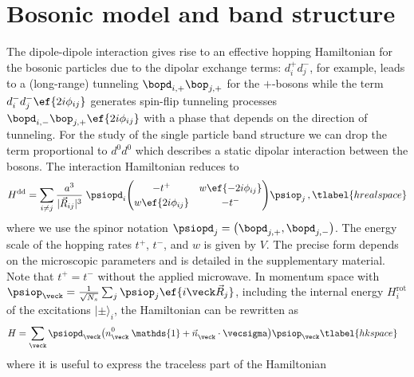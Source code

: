 \section{Bosonic model and band structure}

The dipole-dipole interaction gives rise to an effective hopping Hamiltonian for the bosonic particles due to the dipolar exchange terms:
$d^+_id^-_j$, for example, leads to a (long-range) tunneling $\bopd_{i,+}\bop_{j,+}$ for the ${+}$-bosons while the term $d^-_i d^-_j \ef{2i\phi_{i j}}$ generates spin-flip tunneling processes $\bopd_{i,-}\bop_{j,+} \ef{2i\phi_{ij}}$ with a phase that depends on the direction of tunneling.
For the study of the single particle band structure we can drop the term proportional to $d^0 d^0$ which describes a static dipolar interaction between the bosons.
The interaction Hamiltonian reduces to
\begin{align}
    H^{\text{dd}} = \sum_{i\ne j}
    \frac{a^3}{|\vec{R}_{ij}|^3}\;
    \psiopd_i\!
    \begingroup
        \renewcommand*{\arraystretch}{1.2}
        \begin{pmatrix}
            -t^+ & w \ef{-2i\phi_{ij}} \\
            w \ef{2i\phi_{ij}} & -t^-
        \end{pmatrix}
    \endgroup\!
    \psiop_j \,,
    \tlabel{hrealspace}
\end{align}
where we use the spinor notation $\psiopd_j = \big( \bopd_{j,+} , \bopd_{j,-} \big)$.
The energy scale of the hopping rates $t^+$, $t^-$, and $w$ is given by $V$. The precise form depends on the microscopic parameters and is detailed in the supplementary material.
Note that $t^{+} = t^{-}$ without the applied microwave.
In momentum space with $\psiop_{\veck}=\frac{1}{\sqrt{N_s}}\sum_{j} \psiop_{j}\ef{i\veck\vec{R}_j}$, including the internal energy $H_{i}^{\text{rot}}$ of the excitations $|\pm\rangle_{i}$, the Hamiltonian can be rewritten as
\begin{align}
    H &= \sum_{\veck} \psiopd_{\veck} \big({n^{0\vphantom\dagger}_{\veck} \: \mathds{1} + \vec{n}^{\vphantom \dagger}_{\veck}\cdot\vecsigma}\big) \psiop_{\veck}
    \tlabel{hkspace}
\end{align}
where it is useful to express the traceless part of the Hamiltonian
